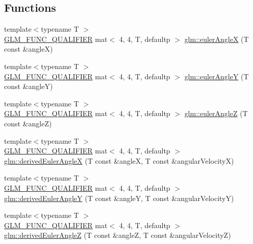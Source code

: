 \subsection*{Functions}
\begin{DoxyCompactItemize}
\item 
{\footnotesize template$<$typename T $>$ }\\\hyperlink{setup_8hpp_a33fdea6f91c5f834105f7415e2a64407}{G\+L\+M\+\_\+\+F\+U\+N\+C\+\_\+\+Q\+U\+A\+L\+I\+F\+I\+ER} mat$<$ 4, 4, T, defaultp $>$ \hyperlink{group__gtx__euler__angles_gafba6282e4ed3ff8b5c75331abfba3489}{glm\+::euler\+AngleX} (T const \&angleX)
\item 
{\footnotesize template$<$typename T $>$ }\\\hyperlink{setup_8hpp_a33fdea6f91c5f834105f7415e2a64407}{G\+L\+M\+\_\+\+F\+U\+N\+C\+\_\+\+Q\+U\+A\+L\+I\+F\+I\+ER} mat$<$ 4, 4, T, defaultp $>$ \hyperlink{group__gtx__euler__angles_gab84bf4746805fd69b8ecbb230e3974c5}{glm\+::euler\+AngleY} (T const \&angleY)
\item 
{\footnotesize template$<$typename T $>$ }\\\hyperlink{setup_8hpp_a33fdea6f91c5f834105f7415e2a64407}{G\+L\+M\+\_\+\+F\+U\+N\+C\+\_\+\+Q\+U\+A\+L\+I\+F\+I\+ER} mat$<$ 4, 4, T, defaultp $>$ \hyperlink{group__gtx__euler__angles_ga5b3935248bb6c3ec6b0d9297d406e251}{glm\+::euler\+AngleZ} (T const \&angleZ)
\item 
{\footnotesize template$<$typename T $>$ }\\\hyperlink{setup_8hpp_a33fdea6f91c5f834105f7415e2a64407}{G\+L\+M\+\_\+\+F\+U\+N\+C\+\_\+\+Q\+U\+A\+L\+I\+F\+I\+ER} mat$<$ 4, 4, T, defaultp $>$ \hyperlink{group__gtx__euler__angles_ga994b8186b3b80d91cf90bc403164692f}{glm\+::derived\+Euler\+AngleX} (T const \&angleX, T const \&angular\+VelocityX)
\item 
{\footnotesize template$<$typename T $>$ }\\\hyperlink{setup_8hpp_a33fdea6f91c5f834105f7415e2a64407}{G\+L\+M\+\_\+\+F\+U\+N\+C\+\_\+\+Q\+U\+A\+L\+I\+F\+I\+ER} mat$<$ 4, 4, T, defaultp $>$ \hyperlink{group__gtx__euler__angles_ga0a4c56ecce7abcb69508ebe6313e9d10}{glm\+::derived\+Euler\+AngleY} (T const \&angleY, T const \&angular\+VelocityY)
\item 
{\footnotesize template$<$typename T $>$ }\\\hyperlink{setup_8hpp_a33fdea6f91c5f834105f7415e2a64407}{G\+L\+M\+\_\+\+F\+U\+N\+C\+\_\+\+Q\+U\+A\+L\+I\+F\+I\+ER} mat$<$ 4, 4, T, defaultp $>$ \hyperlink{group__gtx__euler__angles_gae8b397348201c42667be983ba3f344df}{glm\+::derived\+Euler\+AngleZ} (T const \&angleZ, T const \&angular\+VelocityZ)

\end{DoxyCompactItemize}

